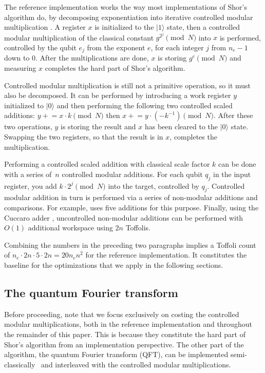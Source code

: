 \documentclass[a4paper, onecolumn, accepted=2021-03-29]{quantumarticle}
\newcommand{\lenexp}{{n_e}}
\newcommand{\productreg}{x}
\newcommand{\workreg}{y}
\newcommand{\gen}{g}
\begin{document}
The reference implementation works the way most implementations of Shor's algorithm do, by decomposing exponentiation into iterative controlled modular multiplication \cite{vedral1996arithmetic, zalka1998fast, zalka2006pure, beauregard2002shor, haner2016factoring, gidney2017factoring}.
A register $\productreg$ is initialized to the $|1\rangle$ state, then a controlled modular multiplication of the classical constant $\gen^{2^j} \pmod{N}$ into $\productreg$ is performed, controlled by the qubit $e_j$ from the exponent $e$, for each integer $j$ from $\lenexp-1$ down to $0$.
After the multiplications are done, $\productreg$ is storing $\gen^e \pmod{N}$ and measuring $\productreg$ completes the hard part of Shor's algorithm.

Controlled modular multiplication is still not a primitive operation, so it must also be decomposed.
It can be performed by introducing a work register $\workreg$ initialized to $|0\rangle$ and then performing the following two controlled scaled additions: $\workreg \mathrel{+}= \productreg \cdot k \pmod{N}$ then $\productreg \mathrel{+}= \workreg \cdot (-k^{-1}) \pmod{N}$.
After these two operations, $\workreg$ is storing the result and $\productreg$ has been cleared to the $|0\rangle$ state.
Swapping the two registers, so that the result is in $\productreg$, completes the multiplication.

Performing a controlled scaled addition with classical scale factor $k$ can be done with a series of~$n$ controlled modular additions.
For each qubit $q_j$ in the input register, you add $k \cdot 2^j \pmod{N}$ into the target, controlled by $q_j$.
Controlled modular addition in turn is performed via a series of non-modular additions and comparisons.
For example, \cite{vedral1996arithmetic} uses five additions for this purpose.
Finally, using the Cuccaro adder \cite{cuccaro2004adder}, uncontrolled non-modular additions can be performed with~$O(1)$ additional workspace using $2n$ Toffolis.

Combining the numbers in the preceding two paragraphs implies a Toffoli count of $\lenexp \cdot 2n \cdot 5 \cdot 2n = 20 \lenexp n^2$ for the reference implementation.
It constitutes the baseline for the optimizations that we apply in the following sections.

\subsection{The quantum Fourier transform}
Before proceeding, note that we focus exclusively on costing the controlled modular multiplications, both in the reference implementation and throughout the remainder of this paper.
This is because they constitute the hard part of Shor's algorithm from an implementation perspective.
The other part of the algorithm, the quantum Fourier transform (QFT), can be implemented semi-classically~\cite{griffiths1996semiclassical} and interleaved with the controlled modular multiplications.
\end{document}
